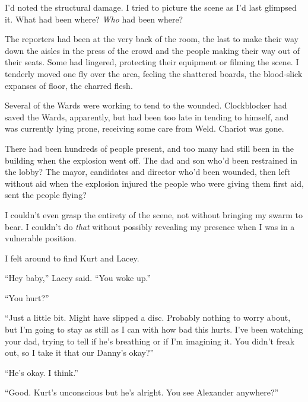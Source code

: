 I'd noted the structural damage.  I tried to picture the scene as I'd last glimpsed it.  What had been where?  \emph{Who }had been where?



The reporters had been at the very back of the room, the last to make their way down the aisles in the press of the crowd and the people making their way out of their seats.  Some had lingered, protecting their equipment or filming the scene.  I tenderly moved one fly over the area, feeling the shattered boards, the blood-slick expanses of floor, the charred flesh.



Several of the Wards were working to tend to the wounded.  Clockblocker had saved the Wards, apparently, but had been too late in tending to himself, and was currently lying prone, receiving some care from Weld.  Chariot was gone.



There had been hundreds of people present, and too many had still been in the building when the explosion went off.  The dad and son who'd been restrained in the lobby?  The mayor, candidates and director who'd been wounded, then left without aid when the explosion injured the people who were giving them first aid, sent the people flying?



I couldn't even grasp the entirety of the scene, not without bringing my swarm to bear.  I couldn't do \emph{that} without possibly revealing my presence when I was in a vulnerable position.



I felt around to find Kurt and Lacey.



``Hey baby,'' Lacey said.  ``You woke up.''



``You hurt?''



``Just a little bit.  Might have slipped a disc.  Probably nothing to worry about, but I'm going to stay as still as I can with how bad this hurts.  I've been watching your dad, trying to tell if he's breathing or if I'm imagining it.  You didn't freak out, so I take it that our Danny's okay?''



``He's okay.  I think.''



``Good.  Kurt's unconscious but he's alright.  You see Alexander anywhere?''




